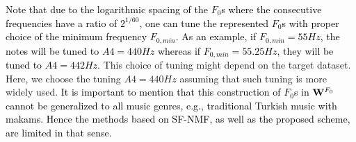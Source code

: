 \documentclass{article}
\newcommand{\db}[1]{{\textcolor{black}{#1}}}
\newcommand{\dbcor}[2]{{\textcolor{black}{#2}}}
\newcommand{\jb}[1]{{\textcolor{black}{#1}}}
\newcommand{\jbcor}[2]{{\textcolor{black}{#2}}}
\begin{document}


\db{Note that due to the logarithmic spacing of the $F_0$s where the consecutive frequencies have a ratio of $2^{1/60}$, one can tune the represented $F_0$s with proper choice of the minimum frequency $F_{0,min}$.}
\jb{As an example, if $F_{0,min}=55Hz$, the notes will be tuned to $A4=440Hz$ whereas if $F_{0,min}=55.25Hz$, they will be tuned to $A4=442Hz$.}
This choice of tuning might depend on the target dataset. 
Here, we choose the tuning $A4=440Hz$ assuming that such tuning is more widely used. \db{It is important to mention that this construction of $F_0$s in
$\mathbf{W}^{F_{0}}$ cannot be generalized to all music genres, e.g., traditional Turkish music with makams. Hence the methods based on SF-NMF, as well as the proposed scheme, are limited in that sense.}   
\end{document}
